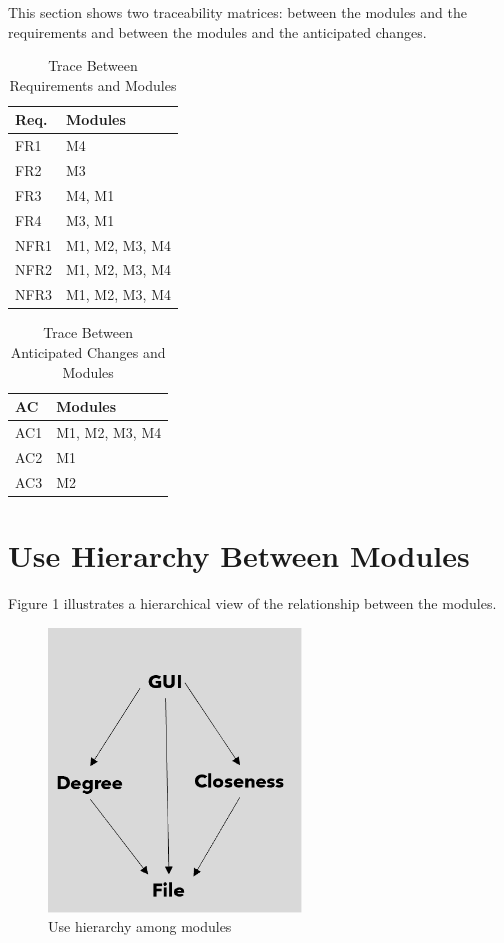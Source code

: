\documentclass[12pt, titlepage]{article}
\begin{document}
This section shows two traceability matrices: between the modules and the
requirements and between the modules and the anticipated changes.

\begin{table}[H]
\centering
\begin{tabular}{p{} p{}}
\toprule
\textbf{Req.} & \textbf{Modules}\\
\midrule
FR1 & M4 \\
FR2 & M3\\
FR3 & M4, M1\\
FR4 & M3, M1\\
NFR1 & M1, M2, M3, M4\\
NFR2 & M1, M2, M3, M4\\
NFR3 & M1, M2, M3, M4\\
\bottomrule
\end{tabular}
\caption{Trace Between Requirements and Modules}
\label{TblRT}
\end{table}

\begin{table}[H]
\centering
\begin{tabular}{p{} p{}}
\toprule
\textbf{AC} & \textbf{Modules}\\
\midrule
AC1 & M1, M2, M3, M4\\
AC2 & M1\\
AC3 & M2\\
\bottomrule
\end{tabular}
\caption{Trace Between Anticipated Changes and Modules}
\label{TblACT}
\end{table}

\section{Use Hierarchy Between Modules} \label{SecUse}

Figure 1 illustrates a hierarchical view of the relationship between the modules.
\begin{figure}[h!]
\begin{center}
 \includegraphics[width=0.6\textwidth]{GRAPH}
\caption{Use hierarchy among modules}
\label{Fig_SystemContext} 
\end{center}
\end{figure}
\end{document}
